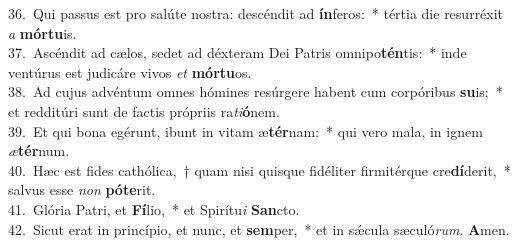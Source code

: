 {36.~}Qui passus est pro salúte nostra: descéndit ad \textbf{ín}feros:~* tértia die resurréxit \textit{a} \textbf{mór}\textbf{tu}is.\\
{37.~}Ascéndit ad cælos, sedet ad déxteram Dei Patris omnipo\textbf{tén}tis:~* inde ventúrus est judicáre vivos \textit{et} \textbf{mór}\textbf{tu}os.\\
{38.~}Ad cujus advéntum omnes hómines resúrgere habent cum corpóribus \textbf{su}is;~* et redditúri sunt de factis própriis ra\textit{ti}\textbf{ó}nem.\\
{39.~}Et qui bona egérunt, ibunt in vitam æ\textbf{tér}nam:~* qui vero mala, in ignem \textit{æ}\textbf{tér}num.\\
{40.~}Hæc est fides cathólica,~† quam nisi quisque fidéliter firmitérque cre\textbf{dí}derit,~* salvus esse \textit{non} \textbf{pó}\textbf{te}rit.\\
{41.~}Glória Patri, et \textbf{Fí}lio,~* et Spirítu\textit{i} \textbf{San}cto.\\
{42.~}Sicut erat in princípio, et nunc, et \textbf{sem}per,~* et in sǽcula sæculó\textit{rum}. \textbf{A}men.\\
